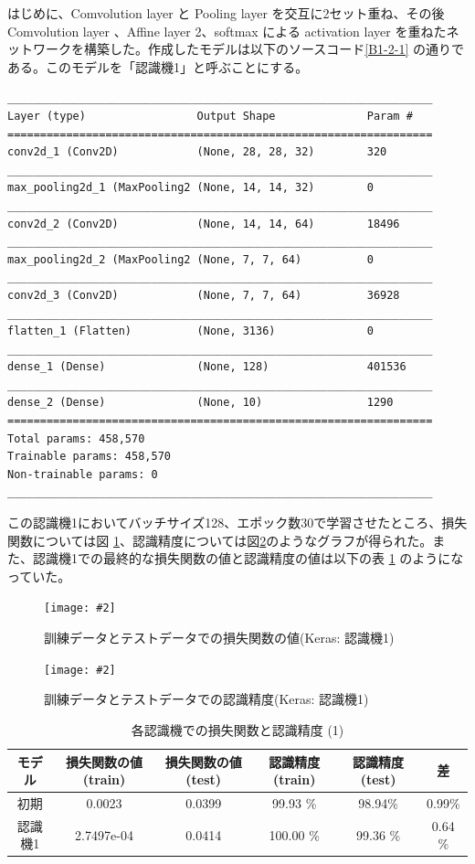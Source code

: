 \documentclass[a4paper,dvipdfmx]{jsarticle}
\newcommand{\image}[3]{
    \begin{figure}[H]
        \begin{center}
        \texttt{[image: \#2]}
        \end{center}
        \caption{#1}
        \label{#3}
    \end{figure}
}
\begin{document}
はじめに、Comvolution layer と Pooling layer を交互に2セット重ね、その後 Comvolution layer 、Affine layer 2、softmax による activation layer を重ねたネットワークを構築した。作成したモデルは以下のソースコード\ref{B1-2-1} の通りである。このモデルを「認識機1」と呼ぶことにする。

\begin{lstlisting}[caption="作成した認識機その1",label=B1-2-1]
_________________________________________________________________
Layer (type)                 Output Shape              Param #
=================================================================
conv2d_1 (Conv2D)            (None, 28, 28, 32)        320
_________________________________________________________________
max_pooling2d_1 (MaxPooling2 (None, 14, 14, 32)        0
_________________________________________________________________
conv2d_2 (Conv2D)            (None, 14, 14, 64)        18496
_________________________________________________________________
max_pooling2d_2 (MaxPooling2 (None, 7, 7, 64)          0
_________________________________________________________________
conv2d_3 (Conv2D)            (None, 7, 7, 64)          36928
_________________________________________________________________
flatten_1 (Flatten)          (None, 3136)              0
_________________________________________________________________
dense_1 (Dense)              (None, 128)               401536
_________________________________________________________________
dense_2 (Dense)              (None, 10)                1290
=================================================================
Total params: 458,570
Trainable params: 458,570
Non-trainable params: 0
_________________________________________________________________
\end{lstlisting}

この認識機1においてバッチサイズ128、エポック数30で学習させたところ、損失関数については図 \ref{fig-B1-2-1}、認識精度については図\ref{fig-B1-2-2}のようなグラフが得られた。また、認識機1での最終的な損失関数の値と認識精度の値は以下の表 \ref{tableB1-2-1} のようになっていた。

\image{訓練データとテストデータでの損失関数の値(Keras: 認識機1)}{report_b1-2-1.png}{fig-B1-2-1}
\image{訓練データとテストデータでの認識精度(Keras: 認識機1)}{report_b1-2-2.png}{fig-B1-2-2}

\begin{table}[H]
\begin{center}
\caption{各認識機での損失関数と認識精度 (1)}
  \begin{tabular}{|c|c|c||c|c|c|} \hline
    モデル & 損失関数の値(train) & 損失関数の値(test) & 認識精度(train) & 認識精度(test) & 差 \\ \hline \hline
    初期 & 0.0023 & 0.0399 & 99.93 \% & 98.94\% & 0.99\% \\ \hline
    認識機1 & 2.7497e-04 & 0.0414 & 100.00 \% & 99.36 \% & 0.64 \% \\ \hline 
  \end{tabular}
	\label{tableB1-2-1}
\end{center}
\end{table}
\end{document}
